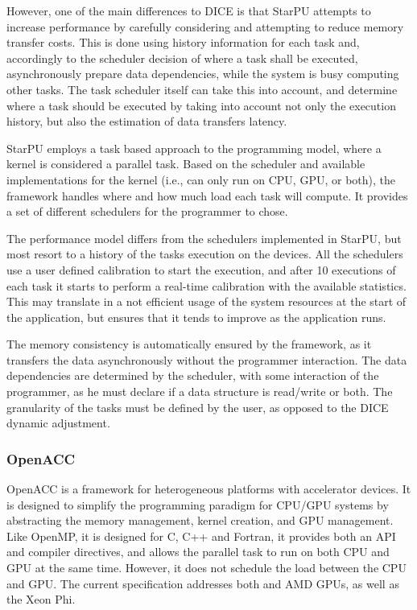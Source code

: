 However, one of the main differences to DICE is that StarPU attempts to increase performance by carefully considering and attempting to reduce memory transfer costs. This is done using history information for each task and, accordingly to the scheduler decision of where a task shall be executed, asynchronously prepare data dependencies, while the system is busy computing other tasks. The task scheduler itself can take this into account, and determine where a task should be executed by taking into account not only the execution history, but also the estimation of data transfers latency.

StarPU employs a task based approach to the programming model, where a kernel is considered a parallel task. Based on the scheduler and available implementations for the kernel (i.e., can only run on CPU, GPU, or both), the framework handles where and how much load each task will compute. It provides a set of different schedulers for the programmer to chose.

The performance model differs from the schedulers implemented in StarPU, but most resort to a history of the tasks execution on the devices. All the schedulers use a user defined calibration to start the execution, and after 10 executions of each task it starts to perform a real-time calibration with the available statistics. This may translate in a not efficient usage of the system resources at the start of the application, but ensures that it tends to improve as the application runs.

The memory consistency is automatically ensured by the framework, as it transfers the data asynchronously without the programmer interaction. The data dependencies are determined by the scheduler, with some interaction of the programmer, as he must declare if a data structure is read/write or both. The granularity of the tasks must be defined by the user, as opposed to the DICE dynamic adjustment.

\subsubsection*{OpenACC}

OpenACC \cite{OpenACC} is a framework for heterogeneous platforms with accelerator devices. It is designed to simplify the programming paradigm for CPU/GPU systems by abstracting the memory management, kernel creation, and GPU management. Like OpenMP, it is designed for C, C++ and Fortran, it provides both an API and compiler directives, and allows the parallel task to run on both CPU and GPU at the same time. However, it does not schedule the load between the CPU and GPU. The current specification addresses both \nvidia and AMD GPUs, as well as the \intel Xeon Phi.

